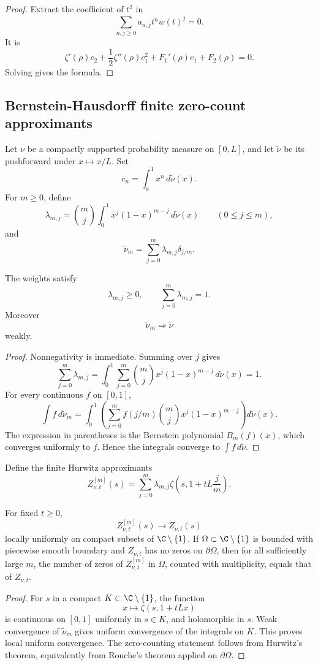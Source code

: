\begin{proof}
Extract the coefficient of \(t^2\) in
\[
   \sum_{n,j\ge0}a_{n,j}t^n w(t)^j=0.
\]
It is
\[
   \zeta'(\rho)c_2+\frac12\zeta''(\rho)c_1^2+F_1'(\rho)c_1+F_2(\rho)=0.
\]
Solving gives the formula.
\end{proof}

\subsection{Bernstein-Hausdorff finite zero-count approximants}

Let \(\nu\) be a compactly supported probability measure on \([0,L]\), and let \(\widetilde\nu\) be its pushforward under \(x\mapsto x/L\).  Set
\[
   c_n=\int_0^1x^n\,d\widetilde\nu(x).
\]
For \(m\ge0\), define
\[
   \lambda_{m,j}=\binom mj\int_0^1 x^j(1-x)^{m-j}\,d\widetilde\nu(x)
   \qquad(0\le j\le m),
\]
and
\[
   \widetilde\nu_m=\sum_{j=0}^m\lambda_{m,j}\delta_{j/m}.
\]

\begin{proposition}\label{prop:bernstein}
The weights satisfy
\[
   \lambda_{m,j}\ge0,
   \qquad
   \sum_{j=0}^m\lambda_{m,j}=1.
\]
Moreover
\[
   \widetilde\nu_m\Rightarrow \widetilde\nu
\]
weakly.
\end{proposition}

\begin{proof}
Nonnegativity is immediate.  Summing over \(j\) gives
\[
   \sum_{j=0}^m\lambda_{m,j}
   =\int_0^1\sum_{j=0}^m\binom mjx^j(1-x)^{m-j}\,d\widetilde\nu(x)=1.
\]
For every continuous \(f\) on \([0,1]\),
\[
   \int f\,d\widetilde\nu_m
   =\int_0^1\left(\sum_{j=0}^m f(j/m)\binom mjx^j(1-x)^{m-j}\right)d\widetilde\nu(x).
\]
The expression in parentheses is the Bernstein polynomial \(B_m(f)(x)\), which converges uniformly to \(f\).  Hence the integrals converge to \(\int f\,d\widetilde\nu\).
\end{proof}

Define the finite Hurwitz approximants
\[
   Z_{\nu,t}^{[m]}(s)=\sum_{j=0}^m\lambda_{m,j}\zeta\left(s,1+tL\frac jm\right).
\]

\begin{theorem}\label{thm:finite-zero-stack}
For fixed \(t\ge0\),
\[
   Z_{\nu,t}^{[m]}(s)\to Z_{\nu,t}(s)
\]
locally uniformly on compact subsets of \(\C\setminus\{1\}\).  If \(\Omega\subset\C\setminus\{1\}\) is bounded with piecewise smooth boundary and \(Z_{\nu,t}\) has no zeros on \(\partial\Omega\), then for all sufficiently large \(m\), the number of zeros of \(Z_{\nu,t}^{[m]}\) in \(\Omega\), counted with multiplicity, equals that of \(Z_{\nu,t}\).
\end{theorem}

\begin{proof}
For \(s\) in a compact \(K\subset\C\setminus\{1\}\), the function
\[
   x\mapsto \zeta(s,1+tLx)
\]
is continuous on \([0,1]\) uniformly in \(s\in K\), and holomorphic in \(s\).  Weak convergence of \(\widetilde\nu_m\) gives uniform convergence of the integrals on \(K\).  This proves local uniform convergence.  The zero-counting statement follows from Hurwitz's theorem, equivalently from Rouche's theorem applied on \(\partial\Omega\).
\end{proof}
